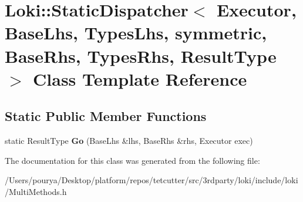\hypertarget{classLoki_1_1StaticDispatcher}{}\section{Loki\+:\+:Static\+Dispatcher$<$ Executor, Base\+Lhs, Types\+Lhs, symmetric, Base\+Rhs, Types\+Rhs, Result\+Type $>$ Class Template Reference}
\label{classLoki_1_1StaticDispatcher}
\subsection*{Static Public Member Functions}
\begin{DoxyCompactItemize}
\item 
\hypertarget{classLoki_1_1StaticDispatcher_a2358d7480c48e46555b784a7a0b3e2d4}{}static Result\+Type {\bfseries Go} (Base\+Lhs \&lhs, Base\+Rhs \&rhs, Executor exec)\label{classLoki_1_1StaticDispatcher_a2358d7480c48e46555b784a7a0b3e2d4}

\end{DoxyCompactItemize}


The documentation for this class was generated from the following file\+:\begin{DoxyCompactItemize}
\item 
/\+Users/pourya/\+Desktop/platform/repos/tetcutter/src/3rdparty/loki/include/loki/Multi\+Methods.\+h\end{DoxyCompactItemize}
